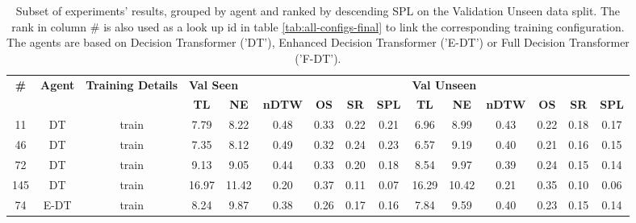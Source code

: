 \begin{table}
\centering
\caption{\label{tab:reward_type}Subset of experiments' results, grouped by agent and ranked by descending SPL on the Validation Unseen data split. The rank in column \# is also used as a look up id in table \ref{tab:all-configs-final} to link the corresponding training configuration.     \newline The agents are based on Decision Transformer ('DT'), Enhanced Decision Transformer ('E-DT') or Full Decision Transformer ('F-DT').}
\begin{tabular}{@{\hskip3pt}c@{\hskip3pt}c@{\hskip3pt}c@{\hskip3pt}c@{\hskip3pt}c@{\hskip3pt}c@{\hskip3pt}c@{\hskip3pt}c@{\hskip3pt}c@{\hskip3pt}c@{\hskip3pt}c@{\hskip3pt}c@{\hskip3pt}c@{\hskip3pt}c@{\hskip3pt}c}
\toprule
\textbf{\#} & \textbf{Agent} & \textbf{Training Details} & \multicolumn{6}{l}{\textbf{Val Seen}} & \multicolumn{6}{l}{\textbf{Val Unseen}} \\
 \textbf{~} &     \textbf{~} &                \textbf{~} &       \textbf{TL} & \textbf{NE} & \textbf{nDTW} & \textbf{OS} & \textbf{SR} & \textbf{SPL} &         \textbf{TL} & \textbf{NE} & \textbf{nDTW} & \textbf{OS} & \textbf{SR} & \textbf{SPL} \\
\midrule
         11 &             DT &                     train &              7.79 &        8.22 &          0.48 &        0.33 &        0.22 &         0.21 &                6.96 &        8.99 &          0.43 &        0.22 &        0.18 &         0.17 \\
         46 &             DT &                     train &              7.35 &        8.12 &          0.49 &        0.32 &        0.24 &         0.23 &                6.57 &        9.19 &          0.40 &        0.21 &        0.16 &         0.15 \\
         72 &             DT &                     train &              9.13 &        9.05 &          0.44 &        0.33 &        0.20 &         0.18 &                8.54 &        9.97 &          0.39 &        0.24 &        0.15 &         0.14 \\
        145 &             DT &                     train &             16.97 &       11.42 &          0.20 &        0.37 &        0.11 &         0.07 &               16.29 &       10.42 &          0.21 &        0.35 &        0.10 &         0.06 \\
         74 &           E-DT &                     train &              8.24 &        9.87 &          0.38 &        0.26 &        0.17 &         0.16 &                7.84 &        9.59 &          0.40 &        0.23 &        0.15 &         0.14 \\

\end{tabular}
\end{table}
